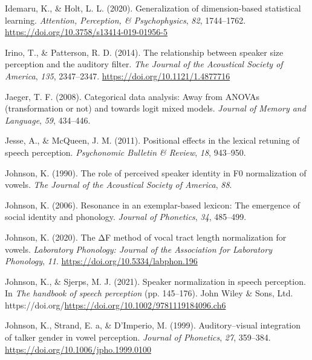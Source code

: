 \documentclass[
  11pt,
  english,
  man,floatsintext]{apa6}
\newlength{\cslhangindent}
\newlength{\cslentryspacingunit} %
\newenvironment{CSLReferences}[2] %
 {%
  \setlength{\parindent}{0pt}
  \ifodd #1
  \let\oldpar\par
  \def\par{\hangindent=\cslhangindent\oldpar}
  \fi
  \setlength{\parskip}{#2\cslentryspacingunit}
 }%
 {}
\begin{document}
\begin{CSLReferences}{1}{0}
\leavevmode{}%
Idemaru, K., \& Holt, L. L. (2020). Generalization of dimension-based statistical learning. \emph{Attention, Perception, \& Psychophysics}, \emph{82}, 1744--1762. \url{https://doi.org/10.3758/s13414-019-01956-5}

\leavevmode{}%
Irino, T., \& Patterson, R. D. (2014). The relationship between speaker size perception and the auditory filter. \emph{The Journal of the Acoustical Society of America}, \emph{135}, 2347--2347. \url{https://doi.org/10.1121/1.4877716}

\leavevmode{}%
Jaeger, T. F. (2008). Categorical data analysis: Away from ANOVAs (transformation or not) and towards logit mixed models. \emph{Journal of Memory and Language}, \emph{59}, 434--446.

\leavevmode{}%
Jesse, A., \& McQueen, J. M. (2011). Positional effects in the lexical retuning of speech perception. \emph{Psychonomic Bulletin \& Review}, \emph{18}, 943--950.

\leavevmode{}%
Johnson, K. (1990). The role of perceived speaker identity in F0 normalization of vowels. \emph{The Journal of the Acoustical Society of America}, \emph{88}.

\leavevmode{}%
Johnson, K. (2006). Resonance in an exemplar-based lexicon: The emergence of social identity and phonology. \emph{Journal of Phonetics}, \emph{34}, 485--499.

\leavevmode{}%
Johnson, K. (2020). The ΔF method of vocal tract length normalization for vowels. \emph{Laboratory Phonology: Journal of the Association for Laboratory Phonology}, \emph{11}. \url{https://doi.org/10.5334/labphon.196}

\leavevmode{}%
Johnson, K., \& Sjerps, M. J. (2021). Speaker normalization in speech perception. In \emph{The handbook of speech perception} (pp. 145--176). John Wiley \& Sons, Ltd. https://doi.org/\url{https://doi.org/10.1002/9781119184096.ch6}

\leavevmode{}%
Johnson, K., Strand, E. a, \& D'Imperio, M. (1999). Auditory--visual integration of talker gender in vowel perception. \emph{Journal of Phonetics}, \emph{27}, 359--384. \url{https://doi.org/10.1006/jpho.1999.0100}


\end{CSLReferences}
\end{document}
